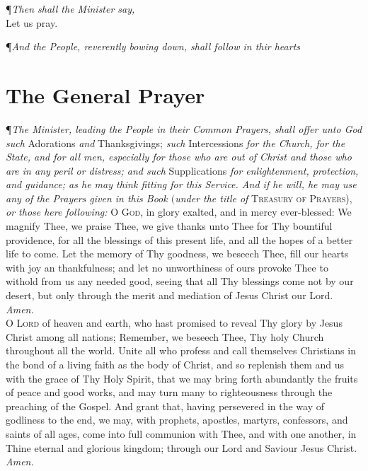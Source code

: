 {\centering \P \textit{Then shall the Minister say,} \\ Let us pray. \par}
\vspace{1ex}
\noindent\P \textit{And the People, reverently bowing down, shall follow in thir hearts}

\section*{The General Prayer}

\P \textit{The Minister, leading the People in their Common Prayers, shall offer unto God such} Adorations \textit{and} Thanksgivings; \textit{such} Intercessions \textit{for the Church, for the State, and for all men, especially for those who are out of Christ and those who are in any peril or distress; and such} Supplications \textit{for enlightenment, protection, and guidance; as he may think fitting for this Service. And if he will, he may use any of the Prayers given in this Book $($under the title of} \textsc{Treasury of Prayers),} \textit{or those here following:}
\vspace{1ex}
\noindent\lettrine{O}{ God,} in glory exalted, and in mercy ever-blessed: We magnify Thee, we praise Thee, we give thanks unto Thee for Thy bountiful providence, for all the blessings of this present life, and all the hopes of a better life to come. Let the memory of Thy goodness, we beseech Thee, fill our hearts with joy an thankfulness; and let no unworthiness of ours provoke Thee to withold from us any needed good, seeing that all Thy blessings come not by our desert, but only through the merit and mediation of Jesus Christ our Lord. \textit{Amen.} \\

\noindent\lettrine{O}{ Lord} of heaven and earth, who hast promised to reveal Thy glory by Jesus Christ among all nations; Remember, we beseech Thee, Thy holy Church throughout all the world. Unite all who profess and call themselves Christians in the bond of a living faith as the body of Christ, and so replenish them and us with the grace of Thy Holy Spirit, that we may bring forth abundantly the fruits of peace and good works, and may turn many to righteousness through the preaching of the Gospel. And grant that, having persevered in the way of godliness to the end, we may, with prophets, apostles, martyrs, confessors, and saints of all ages, come into full communion with Thee, and with one another, in Thine eternal and glorious kingdom; through our Lord and Saviour Jesus Christ. \textit{Amen.} \\

